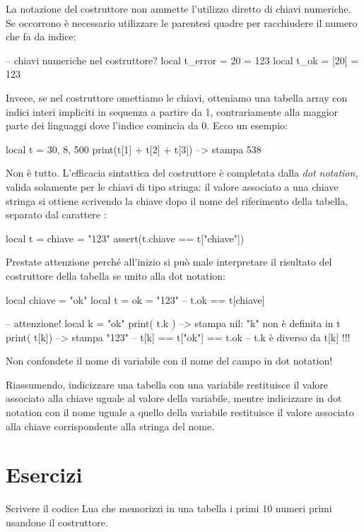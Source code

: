 La notazione del costruttore non ammette l'utilizzo diretto di chiavi
numeriche. Se occorrono è necessario utilizzare le parentesi quadre per
racchiudere il numero che fa da indice:
\begin{lines}
-- chiavi numeriche nel costruttore?
local t_error = { 20 = 123 }
local t_ok = { [20] = 123 }
\end{lines}

Invece, se nel costruttore omettiamo le chiavi, otteniamo una tabella array con
indici interi impliciti in sequenza a partire da 1, contrariamente alla maggior
parte dei linguaggi dove l'indice comincia da 0. Ecco un esempio:
\begin{lines}
local t = { 30, 8, 500 }
print(t[1] + t[2] + t[3]) --> stampa 538
\end{lines}

Non è tutto. L'efficacia sintattica del costruttore è completata dalla
\emph{dot notation}, valida solamente per le chiavi di tipo stringa:
il valore associato a una chiave stringa si ottiene scrivendo la chiave dopo
il nome del riferimento della tabella, separato dal carattere :
\begin{lines}
local t = { chiave = "123" }
assert(t.chiave == t["chiave"])
\end{lines}

Prestate attenzione perché all'inizio si può male interpretare il risultato del
costruttore della tabella se unito alla dot notation:
\begin{lines}
local chiave = "ok"
local t = { ok = "123"} -- t.ok == t[chiave]

-- attenzione!
local k = "ok"
print( t.k ) --> stampa nil: "k" non è definita in t
print( t[k]) --> stampa "123"
-- t[k] == t["ok"] == t.ok
-- t.k è diverso da t[k] !!!
\end{lines}

Non confondete il nome di variabile con il nome del campo in dot notation!

Riassumendo, indicizzare una tabella con una variabile restituisce il valore
associato alla chiave uguale al valore della variabile, mentre indicizzare in
dot notation con il nome uguale a quello della variabile restituisce il valore
associato alla chiave corrispondente alla stringa del nome.


\section{Esercizi}

\begin{Exercise}[label={tab-01}]
Scrivere il codice Lua che memorizzi in una tabella i primi 10 numeri primi
usandone il costruttore.
\end{Exercise}

